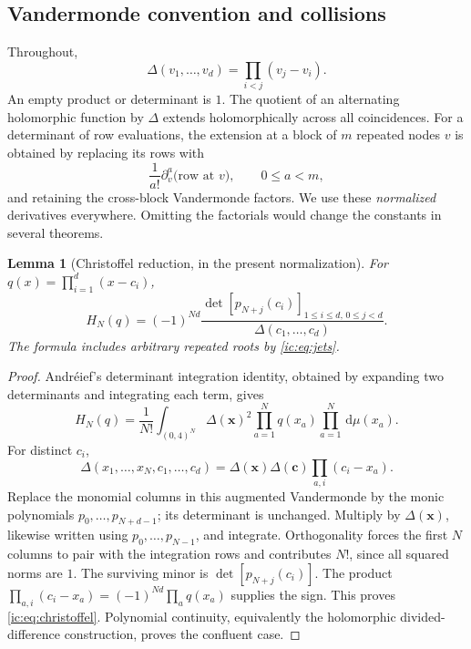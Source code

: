 \documentclass[11pt,a4paper]{article}
\numberwithin{equation}{section}
\newtheorem{lemma}[theorem]{Lemma}
\theoremstyle{definition}
\theoremstyle{remark}
\newcommand{\dd}{\mathrm d}
\newcommand{\Del}{\Delta}
\newcommand{\bx}{\boldsymbol x}
\begin{document}
\subsection{Vandermonde convention and collisions}
Throughout,
\begin{equation}\label{ic:eq:delta}
 \Del(v_1,\ldots,v_d)=\prod_{i<j}(v_j-v_i).
\end{equation}
An empty product or determinant is $1$. The quotient of an alternating
holomorphic function by $\Del$ extends holomorphically across all
coincidences. For a determinant of row evaluations, the extension at a
block of $m$ repeated nodes $v$ is obtained by replacing its rows with
\begin{equation}\label{ic:eq:jets}
 \frac1{a!}\partial_v^a\bigl(\text{row at }v\bigr),
 \qquad 0\le a<m,
\end{equation}
and retaining the cross-block Vandermonde factors. We use these
\emph{normalized} derivatives everywhere. Omitting the factorials would
change the constants in several theorems.

\begin{lemma}[Christoffel reduction, in the present normalization]
\label{ic:lem:christoffel}
For $q(x)=\prod_{i=1}^d(x-c_i)$,
\begin{equation}\label{ic:eq:christoffel}
 H_N(q)=(-1)^{Nd}
 \frac{\det[p_{N+j}(c_i)]_{1\le i\le d,\,0\le j<d}}
 {\Del(c_1,\ldots,c_d)}.
\end{equation}
The formula includes arbitrary repeated roots by \eqref{ic:eq:jets}.
\end{lemma}
\begin{proof}
Andr\'eief's determinant integration identity, obtained by expanding two
determinants and integrating each term, gives
\[
 H_N(q)=\frac1{N!}\int_{(0,4)^N}
 \Del(\bx)^2\prod_{a=1}^Nq(x_a)\prod_{a=1}^N\,\dd\mu(x_a).
\]
For distinct $c_i$,
\[
 \Del(x_1,\ldots,x_N,c_1,\ldots,c_d)
 =\Del(\bx)\Del(\boldsymbol c)
   \prod_{a,i}(c_i-x_a).
\]
Replace the monomial columns in this augmented Vandermonde by the monic
polynomials $p_0,\ldots,p_{N+d-1}$; its determinant is unchanged. Multiply
by $\Del(\bx)$, likewise written using $p_0,\ldots,p_{N-1}$, and integrate.
Orthogonality forces the first $N$ columns to pair with the integration
rows and contributes $N!$, since all squared norms are $1$. The surviving
minor is $\det[p_{N+j}(c_i)]$. The product
$\prod_{a,i}(c_i-x_a)=(-1)^{Nd}\prod_aq(x_a)$ supplies the sign. This proves
\eqref{ic:eq:christoffel}. Polynomial continuity, equivalently the
holomorphic divided-difference construction, proves the confluent case.
\end{proof}
\end{document}

